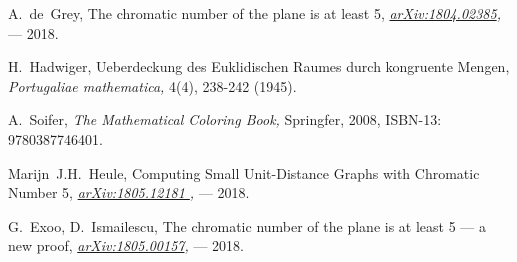 \begin{thebibliography}{0}
    
    A.~de~Grey, 
    The chromatic number of the plane is at least 5, 
    {\it \href{arXiv:1804.02385}{arXiv:1804.02385}, }
    --- 2018. 

    H.~Hadwiger,
    Ueberdeckung des Euklidischen Raumes durch kongruente Mengen,
    {\it Portugaliae mathematica,}
    4(4), 238-242 (1945).
    
    A.~Soifer,
    {\it The Mathematical Coloring Book,}
    Springfer, 2008, ISBN-13: 9780387746401.

    Marijn~J.H.~Heule,
    Computing Small Unit-Distance Graphs with Chromatic Number 5,
    {\it \href{ arXiv:1805.12181}{ arXiv:1805.12181 },} 
    --- 2018.
    
    G.~Exoo, D.~Ismailescu,
    The chromatic number of the plane is at least 5 --- a new proof,
    {\it \href{ arXiv:1805.00157}{ arXiv:1805.00157}, }
    --- 2018.
    

\end{thebibliography}